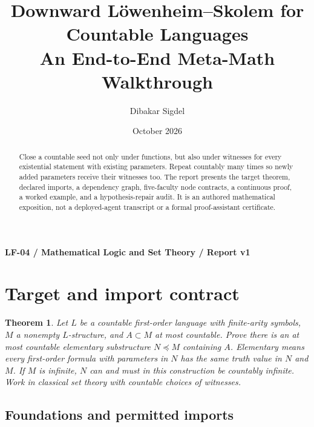 \documentclass[preprint,12pt,aps,pra,showkeys,amsmath,amssymb,superscriptaddress,floatfix]{revtex4-2}
\newtheorem{theorem}{Theorem}[section]
\theoremstyle{definition}
\theoremstyle{remark}
\begin{document}
\title{Downward Löwenheim--Skolem for Countable Languages\\[4pt]\large An End-to-End Meta-Math Walkthrough}

\author{Dibakar Sigdel}


\date{October 2026}

\begin{abstract}

Close a countable seed not only under functions, but also under
witnesses for every existential statement with existing parameters.
Repeat countably many times so newly added parameters receive their
witnesses too. The report presents the target theorem, declared imports,
a dependency graph, five-faculty node contracts, a continuous proof, a
worked example, and a hypothesis-repair audit. It is an authored
mathematical exposition, not a deployed-agent transcript or a formal
proof-assistant certificate.

\end{abstract}\maketitle\linespread{1.12}\selectfont

\noindent\textbf{LF-04 / Mathematical Logic and Set Theory / Report v1}

\section{Target and import contract}

\begin{theorem}

Let \(L\) be a countable first-order language with finite-arity symbols,
\(M\) a nonempty \(L\)-structure, and \(A\subset M\) at most countable.
Prove there is an at most countable elementary substructure
\(N\preccurlyeq M\) containing \(A\). Elementary means every first-order
formula with parameters in \(N\) has the same truth value in \(N\) and
\(M\). If \(M\) is infinite, \(N\) can and must in this construction be
countably infinite. Work in classical set theory with countable choices
of witnesses.

\end{theorem}

\subsection{Foundations and permitted imports}
\end{document}
